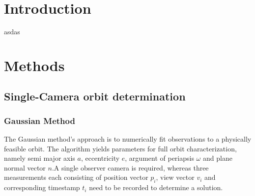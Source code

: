 \documentclass[10pt,a4paper]{article}
\begin{document}
	
	\section{Introduction}\label{sec:introduction}
	asdas
	\section{Methods}\label{sec:methods}
	\subsection{Single-Camera orbit determination}\label{sec:one_camera_determination}
	\subsubsection{Gaussian Method}\label{sec:gauss_method}
	The Gaussian method's approach is to numerically fit observations to a physically feasible orbit.
	The algorithm yields parameters for full orbit characterization, namely semi major axis $a$, eccentricity $e$, argument of periapsis $\omega$ and plane normal vector $n$.\newline A single observer camera is required, whereas three measurements each consisting of position vector $p_i$, view vector $v_i$ and corresponding timestamp $t_i$ need to be recorded to determine a solution. \cite{curtis_gauss_algo}
\end{document}
